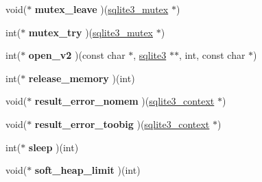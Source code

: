 \begin{DoxyCompactItemize}
\item 
void($\ast$ {\bfseries mutex\+\_\+leave} )(\hyperlink{structsqlite3__mutex}{sqlite3\+\_\+mutex} $\ast$)\hypertarget{structsqlite3__api__routines_ae599184431cf669551ae88f4ca7373c0}{}\label{structsqlite3__api__routines_ae599184431cf669551ae88f4ca7373c0}

\item 
int($\ast$ {\bfseries mutex\+\_\+try} )(\hyperlink{structsqlite3__mutex}{sqlite3\+\_\+mutex} $\ast$)\hypertarget{structsqlite3__api__routines_a04b95233a9977a34ff0f2d9fab44e507}{}\label{structsqlite3__api__routines_a04b95233a9977a34ff0f2d9fab44e507}

\item 
int($\ast$ {\bfseries open\+\_\+v2} )(const char $\ast$, \hyperlink{structsqlite3}{sqlite3} $\ast$$\ast$, int, const char $\ast$)\hypertarget{structsqlite3__api__routines_ac6da992cdbb490e1d1e856a4864851bf}{}\label{structsqlite3__api__routines_ac6da992cdbb490e1d1e856a4864851bf}

\item 
int($\ast$ {\bfseries release\+\_\+memory} )(int)\hypertarget{structsqlite3__api__routines_a2dbb78dde331812425108d9eaeba7bf1}{}\label{structsqlite3__api__routines_a2dbb78dde331812425108d9eaeba7bf1}

\item 
void($\ast$ {\bfseries result\+\_\+error\+\_\+nomem} )(\hyperlink{structsqlite3__context}{sqlite3\+\_\+context} $\ast$)\hypertarget{structsqlite3__api__routines_abaccd85342d77c068d05de2b9cd9c7e0}{}\label{structsqlite3__api__routines_abaccd85342d77c068d05de2b9cd9c7e0}

\item 
void($\ast$ {\bfseries result\+\_\+error\+\_\+toobig} )(\hyperlink{structsqlite3__context}{sqlite3\+\_\+context} $\ast$)\hypertarget{structsqlite3__api__routines_acc888c07a82710c1f0c791ba3058c44c}{}\label{structsqlite3__api__routines_acc888c07a82710c1f0c791ba3058c44c}

\item 
int($\ast$ {\bfseries sleep} )(int)\hypertarget{structsqlite3__api__routines_ae7d2a4258889ab0de44cfce3a9f4b02b}{}\label{structsqlite3__api__routines_ae7d2a4258889ab0de44cfce3a9f4b02b}

\item 
void($\ast$ {\bfseries soft\+\_\+heap\+\_\+limit} )(int)\hypertarget{structsqlite3__api__routines_a217004dbd021cb40d5ad24f963c68451}{}\label{structsqlite3__api__routines_a217004dbd021cb40d5ad24f963c68451}


\end{DoxyCompactItemize}
